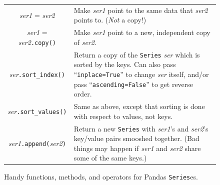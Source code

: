 \begin{figure}[ht]
\begin{tabular}{c|p{3.3in}}
\textsl{ser1} = \textsl{ser2} & Make \textsl{ser1} point to the same data that
\textsl{ser2} points to. (\textit{Not} a copy!)\\

\textsl{ser1} = \textsl{ser2}\texttt{.copy()} & Make \textsl{ser1} point to a
new, independent copy of \textsl{ser2}. \\

\textsl{ser}\texttt{.sort\_index()} & Return a copy of the \texttt{Series}
\textsl{ser} which is sorted by the keys. Can also pass
``\texttt{inplace=True}'' to change \textsl{ser} itself, and/or pass
``\texttt{ascending=False}'' to get reverse order. \\

\textsl{ser}\texttt{.sort\_values()} & Same as above, except that sorting is
done with respect to values, not keys. \\

\textsl{ser1}\texttt{.append(}\textsl{ser2}\texttt{)} & 
Return a new \texttt{Series} with \textsl{ser1}'s and \textsl{ser2}'s key/value
pairs smooshed together. (Bad things may happen if \textsl{ser1} and
\textsl{ser2} share some of the same keys.) \\

\end{tabular}
\bigskip
\caption{Handy functions, methods, and operators for Pandas \texttt{Series}es.}
\label{fig:handySeries}
\end{figure}
